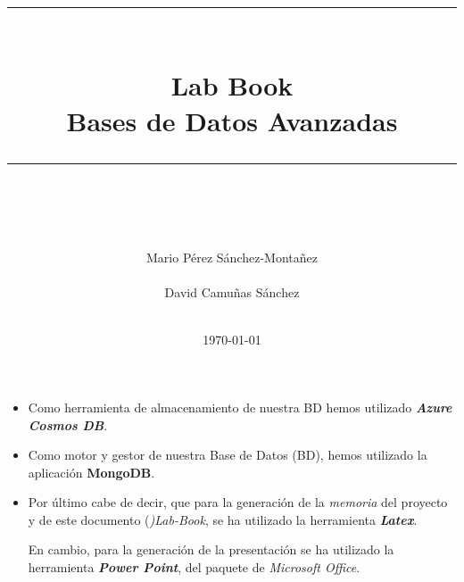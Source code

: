 \documentclass[idxtotoc,hyperref,openany]{labbook} %
\newcommand{\HRule}{\rule{\linewidth}{0.5mm}} %
\begin{document}

\frontmatter %
\title{
\begin{center}
	\centering
\HRule \\[0.4cm]
{\Huge \bfseries Lab Book \\[0.5cm] \Large Bases de Datos Avanzadas}\\[0.4cm] %
\HRule \\[1.5cm]
\end{center}
}
\author{\Huge Mario Pérez Sánchez-Montañez \\ \\ \Huge David Camuñas Sánchez \\ \\ [2cm]} %
\date{\today}
\maketitle

\tableofcontents

\mainmatter %









\begin{itemize}
	\item Como herramienta de almacenamiento de nuestra BD hemos utilizado \textbf{\textit{Azure Cosmos DB}}.
	
	\item  Como motor y gestor de nuestra Base de Datos (BD), hemos utilizado la aplicación \textbf{MongoDB}.
	
	\item  Por último cabe de decir, que para la generación de la \textit{memoria} del proyecto y de este documento (\textit{)Lab-Book}, se ha utilizado la herramienta \textit{\textbf{Latex}}.
	
	En cambio, para la generación de la presentación se ha utilizado la herramienta \textit{\textbf{Power Point}}, del paquete de \textit{Microsoft Office}.
\end{itemize}
\end{document}
